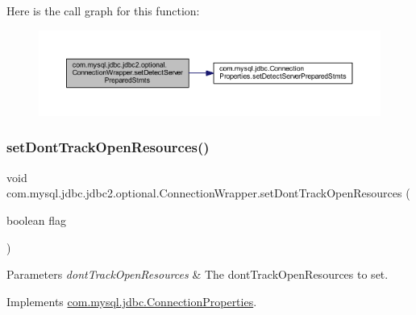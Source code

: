 Here is the call graph for this function\+:
\nopagebreak
\begin{figure}[H]
\begin{center}
\leavevmode
\includegraphics[width=350pt]{classcom_1_1mysql_1_1jdbc_1_1jdbc2_1_1optional_1_1_connection_wrapper_a0c80fd9ac23df453f078c771d7b88760_cgraph}
\end{center}
\end{figure}
\mbox{\label{classcom_1_1mysql_1_1jdbc_1_1jdbc2_1_1optional_1_1_connection_wrapper_abae4382f9155415413562a3593b61a5d}} 
\subsubsection{\texorpdfstring{set\+Dont\+Track\+Open\+Resources()}{setDontTrackOpenResources()}}
{\footnotesize\ttfamily void com.\+mysql.\+jdbc.\+jdbc2.\+optional.\+Connection\+Wrapper.\+set\+Dont\+Track\+Open\+Resources (\begin{DoxyParamCaption}\item[{boolean}]{flag }\end{DoxyParamCaption})}


\begin{DoxyParams}{Parameters}
{\em dont\+Track\+Open\+Resources} & The dont\+Track\+Open\+Resources to set. \\
\hline
\end{DoxyParams}


Implements \mbox{\hyperlink{interfacecom_1_1mysql_1_1jdbc_1_1_connection_properties_a71698dd42306aa0d570cda6344bc8680}{com.\+mysql.\+jdbc.\+Connection\+Properties}}.

